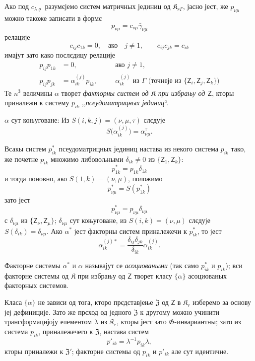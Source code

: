 \documentclass[11pt]{article}
\begin{document}
Ако под \(c_{\lambda\varrho}\) разумєјемо систем матричных јединиц од \(\mathfrak K_{r\Gamma}\), јасно јест, же \(p_{\nu\mu}\) можно такоже записати в формє
\[
p_{\nu\mu}=c_{\nu\mu}\bar\gamma_{\nu\mu}
\]
релације
\[
c_{ij}c_{1k}=0,\quad\text{ако}\quad j\ne1,
\qquad
c_{ij}c_{jk}=c_{ik}
\]
имајут зато како послєдицу релације
\[
\begin{aligned}
p_{ij}p_{1k}&=0,\quad &&\text{ако }j\ne1,\\
p_{ij}p_{jk}&=\alpha_{ik}^{(j)}p_{ik},\quad
&&\alpha_{ik}^{(j)}\text{ из }\Gamma\text{ (точнеје из }\{\mathsf{Z}_i,\mathsf{Z}_j,\mathsf{Z}_k\}\text{)}
\end{aligned}
\]
Те \(n^3\) величины \(\alpha\) творет \emph{факторны систем од \(\mathfrak K\) при избрању од \(\mathsf{Z}\)}, кторы приналежи к систему \(p_{ik}\) ,,\emph{псеудоматрицных јединиц}``.

\(\alpha\) сут коњуговане: Из \(S(i,k,j)=(\nu,\mu,\tau)\) слєдује
\[
S\bigl(\alpha_{ik}^{(j)}\bigr)=\alpha_{\nu\mu}^{\tau}.
\]

Всакы систем \(p_{ik}^*\) псеудоматрицных јединиц настава из некого система \(p_{ik}\) тако, же почетне \(p_{ik}\) множимо либовољными \(\delta_{ik}\ne0\) из \(\{\mathsf{Z}_1,\mathsf{Z}_k\}\):
\[
p_{1k}^*=p_{1k}\delta_{1k}
\]
и тогда поновно, ако \(S(1,k)=(\nu,\mu)\), положимо
\[
p_{\nu\mu}^*=S(p_{1k}^*)
\]
зато јест
\[
p_{\nu\mu}^*=p_{\nu\mu}\delta_{\nu\mu}
\]
с \(\delta_{\nu\mu}\) из \(\{\mathsf{Z}_\nu,\mathsf{Z}_\mu\}\); \(\delta_{\nu\mu}\) сут коњуговане, из \(S(i,k)=(\nu,\mu)\) слєдује \(S(\delta_{ik})=\delta_{\nu\mu}\). Ако \(\alpha^*\) јест факторны систем приналежечи к \(p_{ik}^*\), то јест
\[
\alpha_{ik}^{(j)*}=\frac{\delta_{ij}\delta_{jk}}{\delta_{ik}}\alpha_{ik}^{(j)}.
\]

Факторне системы \(\alpha^*\) и \(\alpha\) называјут се \emph{асоциоваными} (так само \(p_{ik}^*\) и \(p_{ik}\)); вси факторне системы од \(\mathfrak K\) при избрању од \(\mathsf{Z}\) творет класу \(\{\alpha\}\) асоциованых факторных системов.

Класа \(\{\alpha\}\) не зависи од тога, кторо прєдставјење \(\mathfrak Z\) од \(\mathsf{Z}\) в \(\mathfrak K_r\) изберемо за основу јеј дефиниције. Зато же прєход од једного \(\mathfrak Z\) к другому можно учинити трансформацијоју елементом \(\lambda\) из \(\mathfrak K_r\), кторы јест зато \(\mathfrak G\)-инвариантны; зато из система \(p_{ik}\), приналежечего к \(\mathfrak Z\), настава систем
\[
p'_{ik}=\lambda^{-1}p_{ik}\lambda,
\]
кторы приналежи к \(\mathfrak Z'\); факторне системы од \(p_{ik}\) и \(p'_{ik}\) але сут идентичне.
\end{document}
